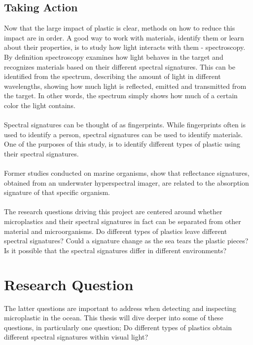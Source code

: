 \subsection{Taking Action}
Now that the large impact of plastic is clear, methods on how to reduce this impact are in order. A good way to work with materials, identify them or learn about their properties, is to study how light interacts with them - spectroscopy. By definition spectroscopy examines how light behaves in the target and recognizes materials based on their different spectral signatures. This can be identified from the spectrum, describing the amount of light in different wavelengths, showing how much light is reflected, emitted and transmitted from the target. In other words, the spectrum simply shows how much of a certain color the light contains. 
\\\\
Spectral signatures can be thought of as fingerprints. While fingerprints often is used to identify a person, spectral signatures can be used to identify materials. One of the purposes of this study, is to identify different types of plastic using their spectral signatures. %
\\\\
Former studies conducted on marine organisms, show that reflectance signatures, obtained from an underwater hyperspectral imager, are related to the absorption signature of that specific organism. %
\\\\
The research questions driving this project are centered around whether microplastics and their spectral signatures in fact can be separated from other material and microorganisms. Do different types of plastics leave different spectral signatures? Could a signature change as the sea tears the plastic pieces? Is it possible that the spectral signatures differ in different environments?
\vspace{1.3cm}
\section{Research Question}
The latter questions are important to address when detecting and inspecting microplastic in the ocean. This thesis will dive deeper into some of these questions, in particularly one question; Do different types of plastics obtain different spectral signatures within visual light?
\vspace{1.3cm}
